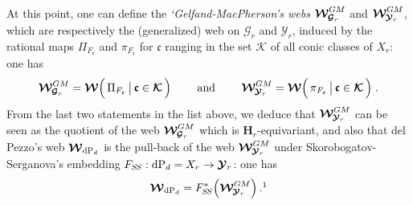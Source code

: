 \documentclass[11pt]{amsart}
\newcommand{\sk}{\smallskip}
\begin{document}
At this point, one can define the {\it `Gelfand-MacPherson's webs} 
$\boldsymbol{\mathcal W}^{GM}_{{}^{} \hspace{-0.05cm} \boldsymbol{\mathcal G}_r  }$ and $\boldsymbol{\mathcal W}^{GM}_{{}^{} \hspace{-0.05cm} \boldsymbol{\mathcal Y}_r  }$, which are respectively the (generalized) web on 
$ \boldsymbol{\mathcal G}_r $ and $ \boldsymbol{\mathcal Y}_r $,  induced by the rational maps ${\Pi_{F_{\boldsymbol{\mathfrak c}}}}$ and ${\pi_{F_{\boldsymbol{\mathfrak c}}}}$  for $\boldsymbol{\mathfrak c}$ ranging in the set 
$\boldsymbol{\mathcal K}$ of all conic classes of $X_r$: one has 
$$
\boldsymbol{\mathcal W}^{GM}_{{}^{} \hspace{-0.05cm} \boldsymbol{\mathcal G}_r  }
= \boldsymbol{\mathcal W}\Big( \, {\Pi_{F_{\boldsymbol{\mathfrak c}}}} \, \big\lvert \, 
\boldsymbol{\mathfrak c} \in \boldsymbol{\mathcal K}\, 
\Big)
\qquad \mbox{ and } 
\qquad 
\boldsymbol{\mathcal W}^{GM}_{{}^{} \hspace{-0.05cm} \boldsymbol{\mathcal Y}_r  }
 = \boldsymbol{\mathcal W}\Big( \, {\pi_{F_{\boldsymbol{\mathfrak c}}}} \, \big\lvert \, 
\boldsymbol{\mathfrak c} \in \boldsymbol{\mathcal K}\, 
\Big)\; . 
$$
From the last two statements in the list above, we deduce that $\boldsymbol{\mathcal W}^{GM}_{{}^{} \hspace{-0.05cm} \boldsymbol{\mathcal Y}_r  }$ can be seen as the quotient of the web $\boldsymbol{\mathcal W}^{GM}_{{}^{} \hspace{-0.05cm} \boldsymbol{\mathcal G}_r  }$ which is $\boldsymbol{H}_r$-equivariant, and also that 
del Pezzo's web $\boldsymbol{\mathcal W}_{ {\rm dP}_d }$ is the pull-back 
 of the web $\boldsymbol{\mathcal W}^{GM}_{{}^{} \hspace{-0.05cm} \boldsymbol{\mathcal Y}_r  }$ under Skorobogatov-Serganova's embedding $ F_{S\hspace{-0.04cm}S}
 : {\rm dP}_d=X_r\rightarrow \boldsymbol{\mathcal Y}_r$: 
one has 
\begin{equation}
\boldsymbol{\mathcal W}_{ {\rm dP}_d }= 
F_{\hspace{-0.02cm}S\hspace{-0.04cm}S}^*
\Big( 
\boldsymbol{\mathcal W}^{GM}_{{}^{} \hspace{-0.05cm} \boldsymbol{\mathcal Y}_r  }
\Big)\, . \footnotemark
\end{equation}
\end{document}
